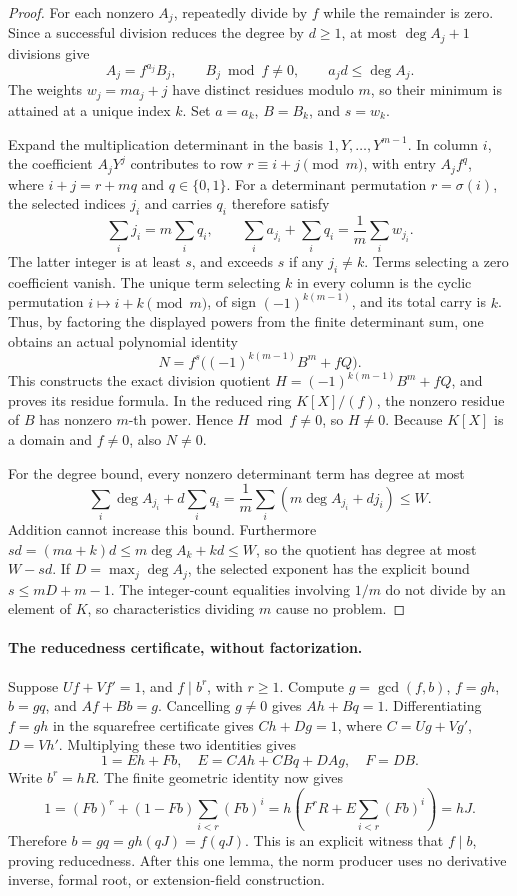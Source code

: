 \begin{proof}
For each nonzero \(A_j\), repeatedly divide by \(f\) while the
remainder is zero.  Since a successful division reduces the degree by
\(d\geq1\), at most \(\deg A_j+1\) divisions give
\[
 A_j=f^{a_j}B_j,\qquad B_j\bmod f\ne0,
 \qquad a_jd\leq\deg A_j.
\]
The weights \(w_j=ma_j+j\) have distinct residues modulo \(m\), so
their minimum is attained at a unique index \(k\).  Set
\(a=a_k\), \(B=B_k\), and \(s=w_k\).

Expand the multiplication determinant in the basis
\(1,Y,\ldots,Y^{m-1}\).  In column \(i\), the coefficient
\(A_jY^j\) contributes to row \(r\equiv i+j\pmod m\), with entry
\(A_j f^q\), where \(i+j=r+mq\) and \(q\in\{0,1\}\).
For a determinant permutation \(r=\sigma(i)\), the selected indices
\(j_i\) and carries \(q_i\) therefore satisfy
\[
 \sum_i j_i=m\sum_iq_i,\qquad
 \sum_i a_{j_i}+\sum_iq_i=\frac1m\sum_iw_{j_i}.
\]
The latter integer is at least \(s\), and exceeds \(s\) if any
\(j_i\ne k\).  Terms selecting a zero coefficient vanish.
The unique term selecting \(k\) in every column is the cyclic
permutation \(i\mapsto i+k\pmod m\), of sign
\((-1)^{k(m-1)}\), and its total carry is \(k\).
Thus, by factoring the displayed powers from the finite determinant sum,
one obtains an actual polynomial identity
\[
 N=f^s\bigl((-1)^{k(m-1)}B^m+fQ\bigr).
\]
This constructs the exact division quotient
\(H=(-1)^{k(m-1)}B^m+fQ\), and proves its residue formula.
In the reduced ring \(K[X]/(f)\), the nonzero residue of \(B\) has
nonzero \(m\)-th power.  Hence \(H\bmod f\ne0\), so \(H\ne0\).
Because \(K[X]\) is a domain and \(f\ne0\), also \(N\ne0\).

For the degree bound, every nonzero determinant term has degree at most
\[
 \sum_i\deg A_{j_i}+d\sum_iq_i
 =\frac1m\sum_i(m\deg A_{j_i}+dj_i)\leq W.
\]
Addition cannot increase this bound.  Furthermore
\(sd=(ma+k)d\leq m\deg A_k+kd\leq W\), so the quotient has
degree at most \(W-sd\).  If \(D=\max_j\deg A_j\), the selected
exponent has the explicit bound \(s\leq mD+m-1\).
The integer-count equalities involving \(1/m\) do not divide by an
element of \(K\), so characteristics dividing \(m\) cause no problem.
\end{proof}

\paragraph{The reducedness certificate, without factorization.}
Suppose \(Uf+Vf'=1\), and \(f\mid b^r\), with \(r\geq1\).
Compute \(g=\gcd(f,b)\), \(f=gh\), \(b=gq\), and
\(Af+Bb=g\).  Cancelling \(g\ne0\) gives \(Ah+Bq=1\).
Differentiating \(f=gh\) in the squarefree certificate gives
\(Ch+Dg=1\), where \(C=Ug+Vg'\), \(D=Vh'\).
Multiplying these two identities gives
\[
 1=Eh+Fb,
 \quad E=CAh+CBq+DAg,
 \quad F=DB.
\]
Write \(b^r=hR\).  The finite geometric identity now gives
\[
 1=(Fb)^r+(1-Fb)\sum_{i<r}(Fb)^i
   =h\left(F^rR+E\sum_{i<r}(Fb)^i\right)=hJ.
\]
Therefore \(b=gq=gh(qJ)=f(qJ)\).  This is an explicit witness that
\(f\mid b\), proving reducedness.  After this one lemma, the norm
producer uses no derivative inverse, formal root, or extension-field
construction.

